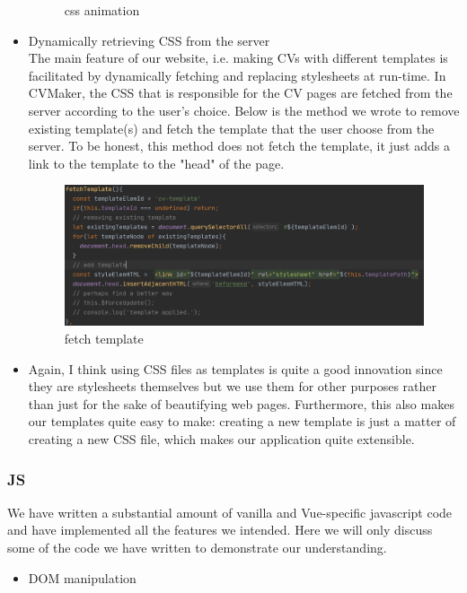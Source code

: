 \documentclass[11pt]{article}
\begin{document}
\begin{spacing}{1.0}
\begin{itemize}
\begin{figure}[H]
 	\caption{css animation}
 	\label{fig:11}
 \end{figure}
\item Dynamically retrieving CSS from the server\\
The main feature of our website, i.e. making CVs with different templates is facilitated by dynamically fetching and replacing stylesheets at run-time.  
In CVMaker, the CSS that is responsible for the CV pages are fetched from the server according to the user's choice. Below is the method we wrote to remove existing template(s) and fetch the template that the user choose from the server. To be honest, this method does not fetch the template, it just adds a link to the template to the "head" of the page. 
 \begin{figure}[H]
	\centering
	\includegraphics[scale=.4]{figures/cssTemplate.png}
	\caption{fetch template}
	\label{fig:12}
\end{figure}

	\item
	Again, I think using CSS files as templates is quite a good innovation since they are stylesheets themselves but we use them for other purposes rather than just for the sake of beautifying web pages. Furthermore, this also makes our templates quite easy to make: creating a new template is just a matter of creating a new CSS file, which makes our application quite extensible.
		
		
	\end{itemize}
	\subsubsection{JS}We have written a substantial amount of vanilla and Vue-specific javascript code and have implemented all the features we intended. Here we will only discuss some of the code we have written to demonstrate our understanding. 
	\begin{itemize}
	\item DOM manipulation
	

\end{itemize}
\end{spacing}
\end{document}
